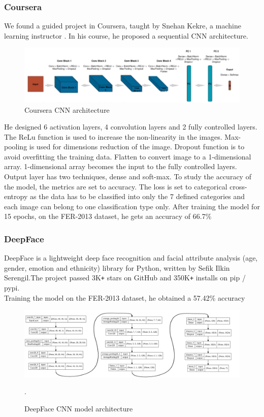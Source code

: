 \documentclass[12pt,a4paper,oneside,english]{book}
\begin{document}
\subsubsection{Coursera}
We found a guided project in Coursera, taught by Snehan Kekre, a machine learning instructor \cite{courseraProject}.
In his course, he proposed a sequential CNN architecture.
\begin{figure}[H]
    \centering
    \includegraphics[width=1\textwidth]{figures/State of art/coursera_CNN_architecture.png}
    \caption{Coursera CNN architecture}
    \label{fig:coursera1}
\end{figure}
\noindent
He designed 6 activation layers, 4 convolution layers and 2 fully controlled layers.
The ReLu function is used to increase the non-linearity in the images. Max-pooling is used for dimensions reduction of the image. Dropout function is to avoid overfitting the training data. Flatten to convert image to a 1-dimensional array. 1-dimensional array becomes the input to the fully controlled layers. Output layer has two techniques, dense and soft-max.
\newline
To study the accuracy of the model, the metrics are set to accuracy.
The loss is set to categorical cross-entropy as the data has to be classified into only the 7 defined categories and each image can belong to one classification type only.
\newline
After training the model for 15 epochs, on the FER-2013 dataset, he gets an accuracy of 66.7\%

\subsubsection{DeepFace}
DeepFace \cite{deepface} is a lightweight deep face recognition and facial attribute analysis (age, gender, emotion and ethnicity) library for Python, written by Sefik Ilkin Serengil.The project passed 3K\texttt{+} stars on GitHub and 350K\texttt{+} installs on pip / pypi.\\
Training the model on the FER-2013 dataset, he obtained a 57.42\% accuracy
\begin{figure}[H]
    \centering
    \includegraphics[width=1\textwidth]{figures/State of art/DeepFacemodel.png}
    \caption{DeepFace CNN model architecture}
    \label{fig:deepface}
     \cite{deepfacearticle}.
\end{figure}
\noindent
\end{document}

